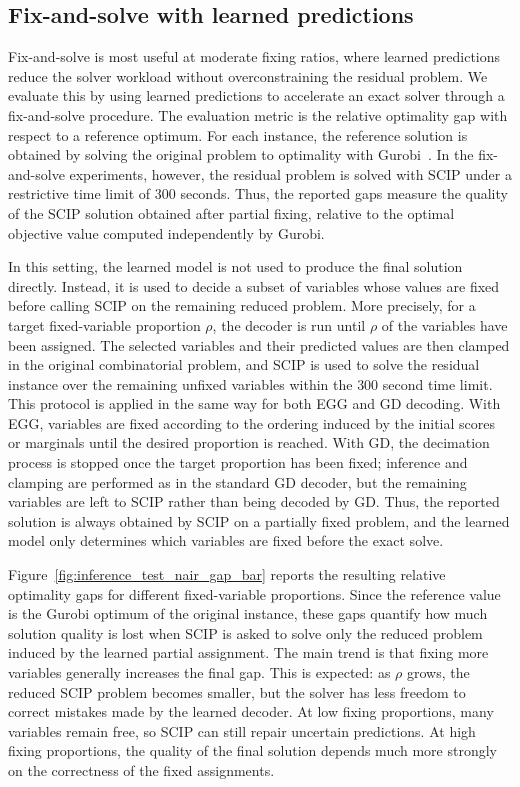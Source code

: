 \subsection{Fix-and-solve with learned predictions}

Fix-and-solve is most useful at moderate fixing ratios, where learned predictions reduce the solver workload without overconstraining the residual problem. We evaluate this by using learned predictions to accelerate an exact solver through a fix-and-solve procedure. The evaluation metric is the relative optimality gap with respect to a reference optimum. For each instance, the reference solution is obtained by solving the original problem to optimality with Gurobi~\cite{gurobi}. In the fix-and-solve experiments, however, the residual problem is solved with SCIP under a restrictive time limit of $300$ seconds. Thus, the reported gaps measure the quality of the SCIP solution obtained after partial fixing, relative to the optimal objective value computed independently by Gurobi.

In this setting, the learned model is not used to produce the final solution directly. Instead, it is used to decide a subset of variables whose values are fixed before calling SCIP on the remaining reduced problem. More precisely, for a target fixed-variable proportion $\rho$, the decoder is run until $\rho$ of the variables have been assigned. The selected variables and their predicted values are then clamped in the original combinatorial problem, and SCIP is used to solve the residual instance over the remaining unfixed variables within the $300$ second time limit. This protocol is applied in the same way for both EGG and GD decoding. With EGG, variables are fixed according to the ordering induced by the initial scores or marginals until the desired proportion is reached. With GD, the decimation process is stopped once the target proportion has been fixed; inference and clamping are performed as in the standard GD decoder, but the remaining variables are left to SCIP rather than being decoded by GD. Thus, the reported solution is always obtained by SCIP on a partially fixed problem, and the learned model only determines which variables are fixed before the exact solve.



Figure~\ref{fig:inference_test_nair_gap_bar} reports the resulting relative optimality gaps for different fixed-variable proportions. Since the reference value is the Gurobi optimum of the original instance, these gaps quantify how much solution quality is lost when SCIP is asked to solve only the reduced problem induced by the learned partial assignment. The main trend is that fixing more variables generally increases the final gap. This is expected: as $\rho$ grows, the reduced SCIP problem becomes smaller, but the solver has less freedom to correct mistakes made by the learned decoder. At low fixing proportions, many variables remain free, so SCIP can still repair uncertain predictions. At high fixing proportions, the quality of the final solution depends much more strongly on the correctness of the fixed assignments.


